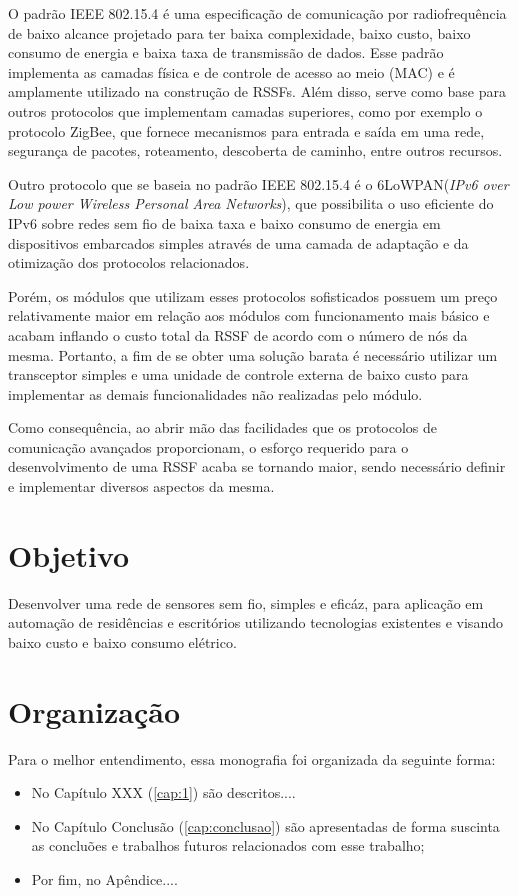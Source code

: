 O padrão IEEE 802.15.4 é uma especificação de comunicação por radiofrequência de baixo alcance projetado para
ter baixa complexidade, baixo custo, baixo consumo de energia e baixa taxa de transmissão de dados. Esse
padrão implementa as camadas física e de controle de acesso ao meio (MAC) e é amplamente utilizado na construção de
RSSFs. Além disso, serve como base para outros protocolos que implementam camadas superiores, como por exemplo
o protocolo ZigBee, que fornece mecanismos para entrada e saída em uma rede, segurança de pacotes, roteamento,
descoberta de caminho, entre outros recursos. \cite{buratti2011}

Outro protocolo que se baseia no padrão IEEE 802.15.4 é o 6LoWPAN(\textit{IPv6 over Low power Wireless
Personal Area Networks}), que possibilita o uso eficiente do IPv6 sobre redes sem fio de baixa taxa e baixo
consumo de energia em dispositivos embarcados simples através de uma camada de adaptação e da otimização dos
protocolos relacionados. \cite{shelby_bormann2009}

Porém, os módulos que utilizam esses protocolos sofisticados possuem um preço relativamente maior em relação
aos módulos com funcionamento mais básico e acabam inflando o custo total da RSSF de acordo com o número de
nós da mesma. Portanto, a fim de se obter uma solução barata é necessário utilizar um transceptor simples e
uma unidade de controle externa de baixo custo para implementar as demais funcionalidades não realizadas pelo
módulo.

Como consequência, ao abrir mão das facilidades que os protocolos de comunicação avançados proporcionam, o
esforço requerido para o desenvolvimento de uma RSSF acaba se tornando maior, sendo necessário definir e
implementar diversos aspectos da mesma.

\section {Objetivo}
Desenvolver uma rede de sensores sem fio, simples e eficáz, para aplicação em automação de residências e
escritórios utilizando tecnologias existentes e visando baixo custo e baixo consumo elétrico.

\section {Organização}
Para o melhor entendimento, essa monografia foi organizada da seguinte forma:

\begin{itemize} \item No Capítulo XXX (\ref{cap:1}) são descritos....

\item No Capítulo Conclusão (\ref{cap:conclusao}) são apresentadas de forma suscinta as concluões e trabalhos
futuros relacionados com esse trabalho;

\item Por fim, no Apêndice....  \end{itemize}
